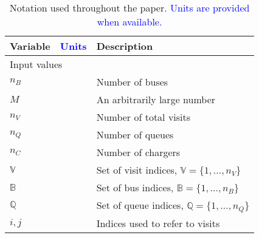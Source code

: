 \documentclass[utf8]{FrontiersinHarvard}
\begin{document}
\begin{table}[!htpb]
  \caption{Notation used throughout the paper. \textcolor{blue}{Units are provided when available.}}
  \label{tab:variables}
  \centering
  \begin{tabularx}{\textwidth}{l l l}
    \toprule \textbf{Variable} & \textcolor{blue}{\textbf{Units}} & \textbf{Description}                                                                                   \\
    \toprule \multicolumn{3}{l}{Input values}                                                                                                                              \\
    \hline $n_B$ & & Number of buses                                                                                                                                       \\
    $M$                      &                         & An arbitrarily large number                                                                                       \\
    $n_V$                    &                         & Number of total visits                                                                                            \\
    $n_Q$                    &                         & Number of queues                                                                                                  \\
    $n_C$                    &                         & Number of chargers                                                                                                \\
    $\mathbb{V}$             &                         & Set of visit indices, $\mathbb{V} = \{1, ..., n_V\}$                                                              \\
    $\mathbb{B}$             &                         & Set of bus indices, $\mathbb{B} = \{1, ..., n_B\}$                                                                \\
    $\mathbb{Q}$                      &                         & Set of queue indices, $\mathbb{Q} = \{1, ..., n_Q\}$                                                                       \\
    $i,j$                    &                         & Indices used to refer to visits                                                                                   \\

\end{tabularx}
\end{table}
\end{document}
